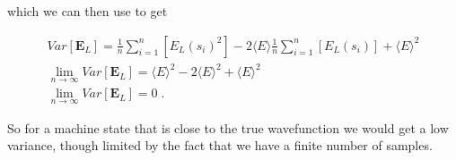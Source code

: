 which we can then use to get

\begin{gather}
  Var[\boldsymbol{E}_L] = 
   \frac{1}{n} \sum_{i=1}^n [E_L(s_i)^2] 
  -2\langle E \rangle \frac{1}{n} \sum_{i=1}^n[E_L(s_i)] 
  + \langle E \rangle^2  \\
   \lim_{n\rightarrow\infty}Var[\boldsymbol{E}_L] =
   \langle E \rangle^2   
  -2\langle E \rangle^2
  + \langle E \rangle^2 \\
  \lim_{n\rightarrow\infty}Var[\boldsymbol{E}_L] = 0 \; .
  \label{eq:variance_local_energy_4}
\end{gather}

So for a machine state that is close to the true wavefunction we would get a low variance, though limited by the fact that we have a finite number of samples.
